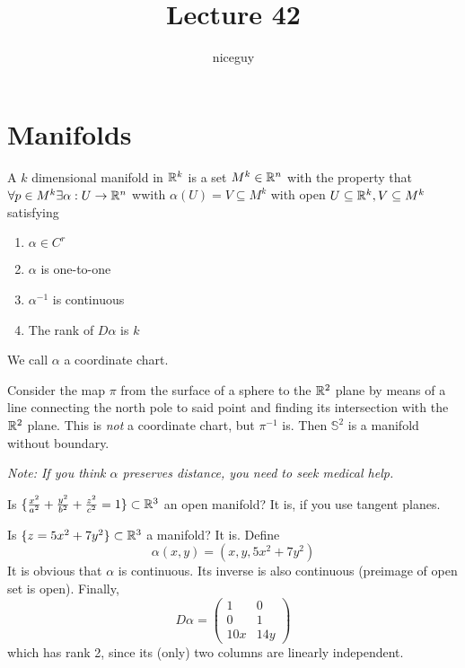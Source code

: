 \documentclass[12pt]{article}
\title{Lecture 42}
\author{niceguy}
\begin{document}
\maketitle

\section{Manifolds}

A $k$ dimensional manifold in $\mathbb{R}^k$ is a set $M^k \in \mathbb{R}^n$ with the property that $\forall p \in M^k \exists \alpha: U \rightarrow \mathbb{R}^n$ wwith $\alpha(U)  = V \subseteq M^k$ with open $U \subseteq \mathbb{R}^k, V \subseteq M^k$ satisfying

\begin{enumerate}
    \item $\alpha \in C^r$
    \item $\alpha$ is one-to-one
    \item $\alpha^{-1}$ is continuous
    \item The rank of $D\alpha$ is $k$
\end{enumerate}

We call $\alpha$ a coordinate chart.

\begin{ex}
    Consider the map $\pi$ from the surface of a sphere to the $\mathbb{R}^2$ plane by means of a line connecting the north pole to said point and finding its intersection with the $\mathbb{R}^2$ plane. This is \textit{not} a coordinate chart, but $\pi^{-1}$ is. Then $\mathbb{S}^2$ is a manifold without boundary.
\end{ex}

\textit{Note: If you think $\alpha$ preserves distance, you need to seek medical help.}

\begin{ex}[Ellipsoid]
    Is $\{\frac{x^2}{a^2} + \frac{y^2}{b^2} + \frac{z^2}{c^2} = 1\} \subset \mathbb{R}^3$ an open manifold? It is, if you use tangent planes.
\end{ex}

\begin{ex}[Parabaloid]
    Is $\{z = 5x^2 + 7y^2\} \subset \mathbb{R}^3$ a manifold? It is. Define
    $$\alpha(x,y) = (x,y,5x^2 + 7y^2)$$
    It is obvious that $\alpha$ is continuous. Its inverse is also continuous (preimage of open set is open). Finally,
    $$D\alpha = \begin{pmatrix} 1 & 0 \\ 0 & 1 \\ 10x & 14y \end{pmatrix}$$
    which has rank 2, since its (only) two columns are linearly independent.
\end{ex}
\end{document}
